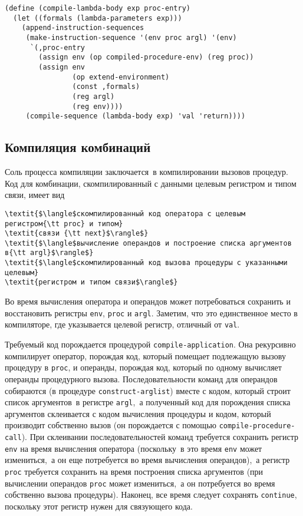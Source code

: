 \begin{Verbatim}[fontsize=\small]
(define (compile-lambda-body exp proc-entry)
  (let ((formals (lambda-parameters exp)))
    (append-instruction-sequences
     (make-instruction-sequence '(env proc argl) '(env)
      `(,proc-entry
        (assign env (op compiled-procedure-env) (reg proc))
        (assign env
                (op extend-environment)
                (const ,formals)
                (reg argl)
                (reg env))))
     (compile-sequence (lambda-body exp) 'val 'return))))
\end{Verbatim}

\subsection{Компиляция комбинаций}
\label{COMPILING-COMBINATIONS}


Соль процесса компиляции заключается~в компилировании
вызовов процедур.  Код для комбинации, скомпилированный с данными
целевым регистром и типом связи, имеет вид

\begin{Verbatim}[fontsize=\small]
\textit{$\langle$скомпилированный код оператора с целевым регистром{\tt proc} и типом}
\textit{связи {\tt next}$\rangle$}
\textit{$\langle$вычисление операндов и построение списка аргументов в{\tt argl}$\rangle$}
\textit{$\langle$скомпилированный код вызова процедуры с указанными целевым} 
\textit{регистром и типом связи$\rangle$}
\end{Verbatim}
Во время вычисления оператора и операндов может потребоваться
сохранить и восстановить регистры {\tt env}, {\tt proc}
и {\tt argl}.  Заметим, что это единственное место в
компиляторе, где указывается целевой регистр, отличный от
{\tt val}.

Требуемый код порождается процедурой
{\tt compile-application}.  Она рекурсивно компилирует
оператор, порождая код, который помещает подлежащую вызову процедуру в
{\tt proc}, и операнды, порождая код, который по одному
вычисляет операнды процедурного вызова.  Последовательности команд для
операндов собираются (в процедуре {\tt construct-arglist})
вместе с кодом, который строит список аргументов~в регистре
{\tt argl},~а полученный код для порождения списка аргументов
склеивается с кодом вычисления процедуры и кодом, который производит
собственно вызов (он порождается с помощью
{\tt compile-procedure-call}).  При склеивании
последовательностей команд требуется сохранить регистр
{\tt env} на время вычисления оператора (поскольку~в это время
{\tt env} может измениться,~а он еще потребуется во время
вычисления операндов),~а регистр {\tt proc} требуется сохранить
на время построения списка аргументов (при вычислении операндов
{\tt proc} может измениться,~а он потребуется во время
собственно вызова процедуры).  Наконец, все время следует сохранять
{\tt continue}, поскольку этот регистр нужен для связующего
кода.

